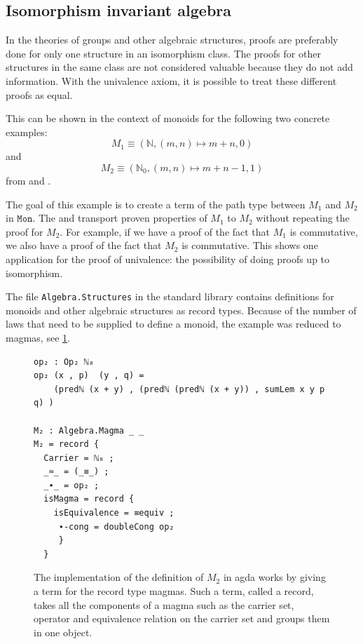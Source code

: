 \documentclass[11pt,a4paper,twoside,xetex,draft]{book}
\newcommand{\op}[1]{\mathtt{#1}}
\begin{document}
\subsection{Isomorphism invariant algebra}

In the theories of groups and other algebraic structures, proofs are preferably done for only one structure in an isomorphism class. The proofs for other structures in the same class are not considered valuable because they do not add information. With the univalence axiom, it is possible to treat these different proofs as equal. 

This can be shown in the context of monoids for the following two concrete examples: $$M_1  \equiv (\mathbb{N}, (m,n)\mapsto m+n, 0)$$ and $$M_2 \equiv (\mathbb{N}_0, (m,n)\mapsto m+n -1, 1)$$ from \cite{Coquand2013} and \cite{Danielsson2012}. 

The goal of this example is to create a term of the path type between  $M_1$ and $M_2$ in $\op{Mon}$. The and transport proven properties of $M_1$ to $M_2$ without repeating the proof for $M_2$. For example, if we have a proof of the fact that $M_1$ is commutative, we also have a proof of the fact that $M_2$ is commutative. This shows one application for the proof of univalence: the possibility of doing proofs up to isomorphism. 

The file \texttt{Algebra.Structures} in the standard library  \cite{Danielsson2019} contains definitions for monoids and other algebraic structures as record types. Because of the number of  laws that need to be supplied to define a monoid, the example was reduced to magmas, see \cref{m2def}. 

\begin{figure}\label{m2def}
 \centering

 
\begin{BVerbatim}
op₂ : Op₂ ℕ₀
op₂ (x , p)  (y , q) = 
    (predℕ (x + y) , (predℕ (predℕ (x + y)) , sumLem x y p q) )

M₂ : Algebra.Magma _ _
M₂ = record {
  Carrier = ℕ₀ ;
  _≈_ = (_≡_) ;
  _∙_ = op₂ ;
  isMagma = record {
    isEquivalence = ≡equiv ;
     ∙-cong = doubleCong op₂
     }
  }
\end{BVerbatim}
 
 \caption{The implementation of the definition of $M_2$ in agda works by giving a term for the record type magmas. Such a term, called a record, takes all the components of a magma such as the carrier set, operator and equivalence relation on the carrier set and groups them in one object.}
\end{figure}
\end{document}
